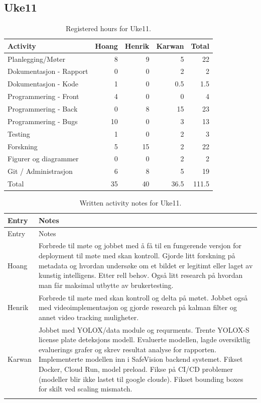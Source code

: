\subsection{Uke11}

\begin{table}[H]
\centering
\small
\caption{Registered hours for Uke11.}
\label{tab:project-hours-uke11}
\begin{tabular}{lrrrr}
\toprule
Activity & Hoang & Henrik & Karwan & Total \\
\midrule
Planlegging/Møter & 8 & 9 & 5 & 22 \\
Dokumentasjon - Rapport & 0 & 0 & 2 & 2 \\
Dokumentasjon - Kode & 1 & 0 & 0.5 & 1.5 \\
Programmering - Front & 4 & 0 & 0 & 4 \\
Programmering - Back & 0 & 8 & 15 & 23 \\
Programmering - Bugs & 10 & 0 & 3 & 13 \\
Testing & 1 & 0 & 2 & 3 \\
Forskning & 5 & 15 & 2 & 22 \\
Figurer og diagrammer & 0 & 0 & 2 & 2 \\
Git / Administrasjon & 6 & 8 & 5 & 19 \\
\midrule
Total & 35 & 40 & 36.5 & 111.5 \\
\bottomrule
\end{tabular}
\end{table}

\begin{longtable}{p{}p{}}
\caption{Written activity notes for Uke11.}\\
\toprule
Entry & Notes \\
\midrule
\endfirsthead
\toprule
Entry & Notes \\
\midrule
\endhead
Hoang & Forbrede til møte og jobbet med å få til en fungerende versjon for deployment til møte med skan kontroll. Gjorde litt forskning på metadata og hvordan undersøke om et bildet er legitimt eller laget av kunstig intelligens. Etter rell behov. Også litt research på hvordan man får maksimal utbytte av brukertesting. \\
\addlinespace
Henrik & Forbrede til møte med skan kontroll og delta på møtet. Jobbet også med videoimplementasjon og gjorde research på kalman filter og annet video tracking muligheter. \\
\addlinespace
Karwan & Jobbet med YOLOX/data module og requrments. Trente YOLOX-S license plate deteksjons modell. Evaluerte modellen, lagde oversiktlig evaluerings grafer og skrev resultat analyse for rapporten. Implementerte modellen inn i SafeVision backend systemet. Fikset Docker, Cloud Run, model preload. Fikse på CI/CD problemer (modeller blir ikke lastet til google cloude). Fikset bounding boxes for skilt ved scaling mismatch. \\
\addlinespace
\bottomrule
\end{longtable}

